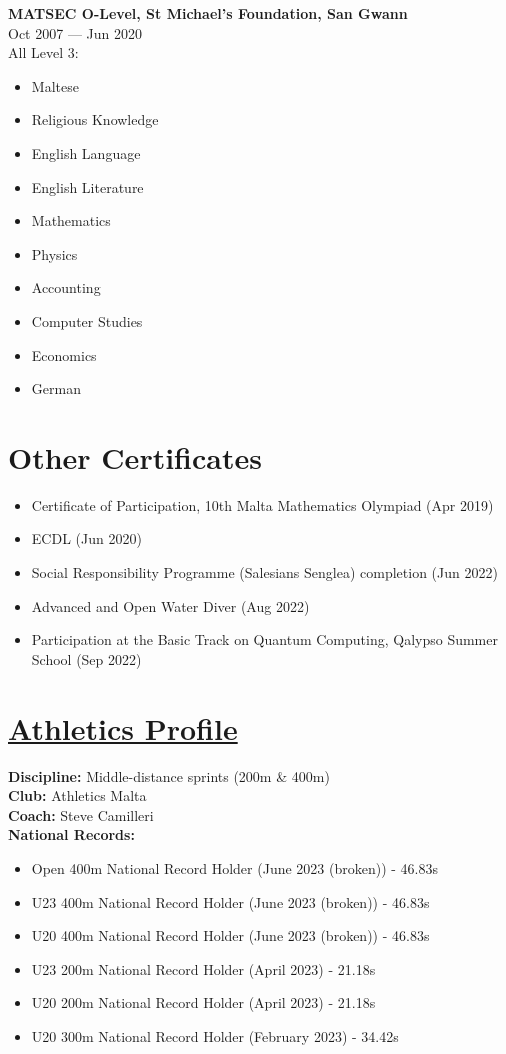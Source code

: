 \documentclass[11pt,a4paper]{article}
\newcommand{\entry}[3]{%
  \noindent\textbf{#1}\\[-1pt]
  \textcolor{muted}{#2}\\
  \color{text}#3\par\vspace{0.6em}}
\begin{document}
\entry{MATSEC O-Level, St Michael's Foundation, San Gwann}{Oct 2007 — Jun 2020}{All Level 3: \begin{itemize}
  \item Maltese
  \item Religious Knowledge
  \item English Language
  \item English Literature
  \item Mathematics
  \item Physics 
  \item Accounting
  \item Computer Studies
  \item Economics
  \item German
\end{itemize}}

\section*{Other Certificates}
\begin{itemize}
  \item Certificate of Participation, 10th Malta Mathematics Olympiad (Apr 2019)
  \item ECDL (Jun 2020)
  \item Social Responsibility Programme (Salesians Senglea) completion (Jun 2022)
  \item Advanced and Open Water Diver (Aug 2022)
  \item Participation at the Basic Track on Quantum Computing, Qalypso Summer School (Sep 2022)
\end{itemize}
\pagebreak
\vspace*{2em}

\section*{\href{https://www.worldathletics.org/athletes/malta/graham-pellegrini-147123}{Athletics Profile}}

\textbf{Discipline:} Middle-distance sprints (200m \& 400m)\\
\textbf{Club:} Athletics Malta\\
\textbf{Coach:} Steve Camilleri\\

\textbf{National Records:}
\begin{itemize}
  \item Open 400m National Record Holder (June 2023 (broken)) - 46.83s
  \item U23 400m National Record Holder (June 2023 (broken)) - 46.83s
  \item U20 400m National Record Holder (June 2023 (broken)) - 46.83s
  \item U23 200m National Record Holder (April 2023) - 21.18s
  \item U20 200m National Record Holder (April 2023) - 21.18s
  \item U20 300m National Record Holder (February 2023) - 34.42s
\end{itemize}
\end{document}
